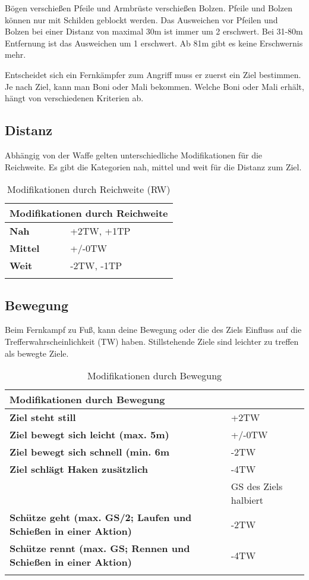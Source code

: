 Bögen verschießen Pfeile und Armbrüste verschießen Bolzen. Pfeile und Bolzen können nur mit Schilden geblockt werden. Das Ausweichen vor Pfeilen und Bolzen bei einer Distanz von maximal 30m ist immer um 2 erschwert. Bei 31-80m Entfernung ist das Ausweichen um 1 erschwert. Ab 81m gibt es keine Erschwernis mehr.

Entscheidet sich ein Fernkämpfer zum Angriff muss er zuerst ein Ziel bestimmen. Je nach Ziel, kann man Boni oder Mali bekommen. Welche Boni oder Mali erhält, hängt von verschiedenen Kriterien ab.

\subsection{Distanz} 
Abhängig von der Waffe gelten unterschiedliche Modifikationen für die Reichweite. Es gibt die Kategorien nah, mittel und weit für die Distanz zum Ziel.

\begin{longtable}{|p{3cm}|p{5cm}|}
\hline
\multicolumn{2}{|l|}{\textbf{Modifikationen durch Reichweite}} \\ \hline
\textbf{Nah} & +2TW, +1TP \\ \hline
\textbf{Mittel} & +/-0TW \\ \hline
\textbf{Weit} & -2TW, -1TP \\ \hline

\caption{Modifikationen durch Reichweite (RW)}
\label{tab:ReichweitenModifikationen}
\end{longtable}

\subsection{Bewegung} 
Beim Fernkampf zu Fuß, kann deine Bewegung oder die des Ziels Einfluss auf die Trefferwahrscheinlichkeit (TW) haben. Stillstehende Ziele sind leichter zu treffen als bewegte Ziele.

\begin{longtable}{|p{6cm}|p{5cm}|}
\hline
\multicolumn{2}{|l|}{\textbf{Modifikationen durch Bewegung}} \\ \hline
\textbf{Ziel steht still} & +2TW \\ \hline
\textbf{Ziel bewegt sich leicht (max. 5m)} & +/-0TW \\ \hline
\textbf{Ziel bewegt sich schnell (min. 6m} & -2TW \\ \hline
\textbf{Ziel schlägt Haken zusätzlich} & -4TW \\
& GS des Ziels halbiert \\ \hline
\textbf{Schütze geht (max. GS/2; Laufen und Schießen in einer Aktion)} & -2TW \\ \hline
\textbf{Schütze rennt (max. GS; Rennen und Schießen in einer Aktion)} & -4TW \\ \hline

\caption{Modifikationen durch Bewegung}
\label{tab:BewegungModifikationen}
\end{longtable}


